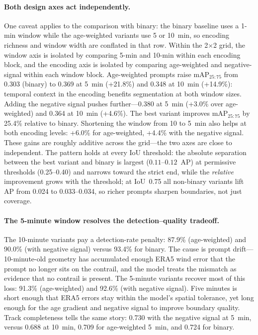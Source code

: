 \documentclass[1p,11pt]{elsarticle}
\begin{document}
\paragraph{Both design axes act independently.} One caveat applies to the comparison with binary: the binary baseline uses a 1-min window while the age-weighted variants use 5 or 10~min, so encoding richness and window width are conflated in that row. Within the 2$\times$2 grid, the window axis is isolated by comparing 5-min and 10-min within each encoding block, and the encoding axis is isolated by comparing age-weighted and negative-signal within each window block. Age-weighted prompts raise mAP$_{25{:}75}$ from 0.303 (binary) to 0.369 at 5~min (+21.8\%) and 0.348 at 10~min (+14.9\%): temporal context in the encoding benefits segmentation at both window sizes. Adding the negative signal pushes further---0.380 at 5~min (+3.0\% over age-weighted) and 0.364 at 10~min (+4.6\%). The best variant improves mAP$_{25{:}75}$ by 25.4\% relative to binary. Shortening the window from 10 to 5~min also helps at both encoding levels: +6.0\% for age-weighted, +4.4\% with the negative signal. These gains are roughly additive across the grid---the two axes are close to independent. The pattern holds at every IoU threshold: the absolute separation between the best variant and binary is largest ($0.11$--$0.12$~AP) at permissive thresholds (0.25--0.40) and narrows toward the strict end, while the \emph{relative} improvement grows with the threshold; at IoU~0.75 all non-binary variants lift AP from 0.024 to 0.033--0.034, so richer prompts sharpen boundaries, not just coverage.

\paragraph{The 5-minute window resolves the detection--quality tradeoff.} The 10-minute variants pay a detection-rate penalty: 87.9\% (age-weighted) and 90.0\% (with negative signal) versus 93.4\% for binary. The cause is prompt drift---10-minute-old geometry has accumulated enough ERA5 wind error that the prompt no longer sits on the contrail, and the model treats the mismatch as evidence that no contrail is present. The 5-minute variants recover most of this loss: 91.3\% (age-weighted) and 92.6\% (with negative signal). Five minutes is short enough that ERA5 errors stay within the model's spatial tolerance, yet long enough for the age gradient and negative signal to improve boundary quality. Track completeness tells the same story: 0.730 with the negative signal at 5~min, versus 0.688 at 10~min, 0.709 for age-weighted 5~min, and 0.724 for binary.
\end{document}
